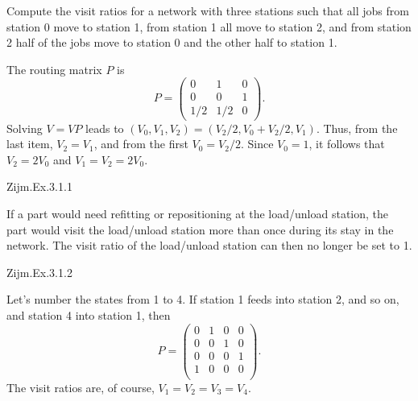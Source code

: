 \begin{exercise}\label{ex:mva}
  Compute the visit ratios for a network with three stations such that all jobs from station 0 move to station 1, from station 1 all move to station 2, and from station 2 half of the jobs move to station 0 and the other half to station 1. 
  \begin{solution}
    The routing matrix $P$ is
    \begin{equation*}
      P = 
      \begin{pmatrix}
        0 & 1 & 0 \\
0& 0 & 1 \\
1/2 & 1/2 & 0
      \end{pmatrix}.
    \end{equation*}
    Solving $V=VP$ leads to
    $(V_0, V_1, V_2) = (V_2/2, V_0 + V_2/2, V_1)$. Thus, from the last
    item, $V_2 = V_1$, and from the first $V_0 = V_2/2$. Since
    $V_0=1$, it follows that $V_2 = 2V_0$ and $V_1=V_2=2 V_0$.
  \end{solution}
\end{exercise}

\begin{exercise}
Zijm.Ex.3.1.1 
\begin{solution}
If a part would need refitting or repositioning at the load/unload station, the part would visit the load/unload station more than once during its stay in the network. The visit ratio of the load/unload station can then no longer be set to 1.
\end{solution}
\end{exercise}

\begin{exercise}
Zijm.Ex.3.1.2
\begin{solution}
Let's number the states from 1 to 4. If station 1 feeds into station 2, and so on, and station 4 into station 1, then 
\begin{equation*}
  P = 
  \begin{pmatrix}
    0 & 1 & 0 & 0\\
    0 & 0 & 1 & 0\\
    0 & 0 & 0 & 1\\
    1 & 0 & 0 & 0\\
  \end{pmatrix}.
\end{equation*}
The visit ratios are, of course, $V_1= V_2 = V_3 = V_4$. 
\end{solution}
\end{exercise}

